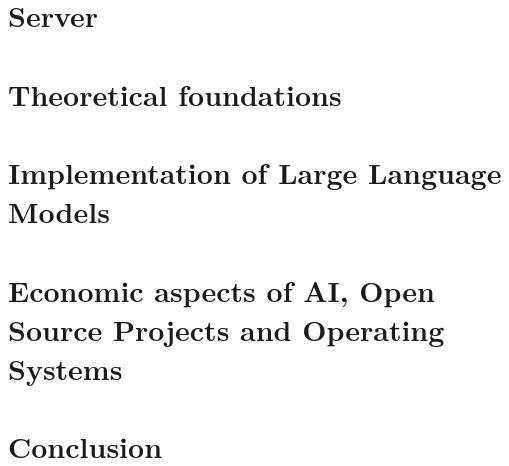 \part{Server}



\part{Theoretical foundations} %
%


%

\part{Implementation of Large Language Models}





%
%


\part{Economic aspects of AI, Open Source Projects and Operating Systems}

 


\part{Conclusion}
%





\appendix                       %







\listoftables
\listoffigures
\lstlistoflistings
\nocite{*}



